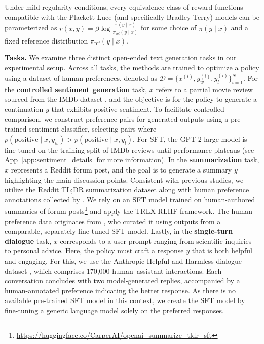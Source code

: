 \begin{theorem}\label{thm:main}
    Under mild regularity conditions, every equivalence class of reward functions compatible with the Plackett-Luce (and specifically Bradley-Terry) models can be parameterized as ${r(x, y) = \beta \log \frac{\pi(y\mid x)}{\pi_\text{ref}(y\mid x)}}$ for some choice of $\pi(y\mid x)$ and a fixed reference distribution $\pi_\text{ref}(y \mid x)$.
\end{theorem}

\textbf{Tasks.} We examine three distinct open-ended text generation tasks in our experimental setup. Across all tasks, the methods are trained to optimize a policy using a dataset of human preferences, denoted as $\mathcal{D}=\bigl\{x^{(i)}, y_w^{(i)}, y_l^{(i)}\bigr\}_{i=1}^N$. For the \textbf{controlled sentiment generation} task, $x$ refers to a partial movie review sourced from the IMDb dataset \cite{maas-EtAl:2011:ACL-HLT2011}, and the objective is for the policy to generate a continuation $y$ that exhibits positive sentiment. To facilitate controlled comparison, we construct preference pairs for generated outputs using a pre-trained sentiment classifier, selecting pairs where $p(\text{positive}\mid x,y_w)>p(\text{positive}\mid x,y_l)$. For SFT, the GPT-2-large model is fine-tuned on the training split of IMDb reviews until performance plateaus (see App~\ref{app:sentiment_details} for more information). In the \textbf{summarization} task, $x$ represents a Reddit forum post, and the goal is to generate a summary $y$ highlighting the main discussion points. Consistent with previous studies, we utilize the Reddit TL;DR summarization dataset \citep{volske-etal-2017-tl} along with human preference annotations collected by \citeauthor{stiennon2022learning}. We rely on an SFT model trained on human-authored summaries of forum posts\footnote{\url{https://huggingface.co/CarperAI/openai_summarize_tldr_sft}} and apply the TRLX \citep{leandro_von_werra_2023_7790115} RLHF framework. The human preference data originates from \citeauthor{stiennon2022learning}, who curated it using outputs from a comparable, separately fine-tuned SFT model. Lastly, in the \textbf{single-turn dialogue} task, $x$ corresponds to a user prompt ranging from scientific inquiries to personal advice. Here, the policy must craft a response $y$ that is both helpful and engaging. For this, we use the Anthropic Helpful and Harmless dialogue dataset \citep{bai2022training}, which comprises 170,000 human–assistant interactions. Each conversation concludes with two model-generated replies, accompanied by a human-annotated preference indicating the better response. As there is no available pre-trained SFT model in this context, we create the SFT model by fine-tuning a generic language model solely on the preferred responses.


